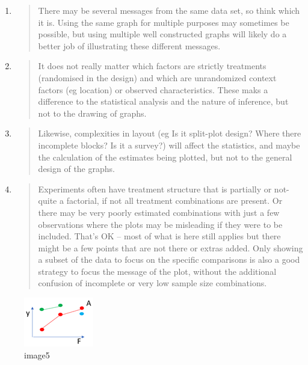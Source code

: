 \documentclass[
]{book}
\begin{document}
\begin{enumerate}
\def\labelenumi{\alph{enumi}.}
\item
  \begin{quote}
  There may be several messages from the same data set, so think which it is. Using the same graph for multiple purposes may sometimes be possible, but using multiple well constructed graphs will likely do a better job of illustrating these different messages.
  \end{quote}
\item
  \begin{quote}
  It does not really matter which factors are strictly treatments (randomised in the design) and which are unrandomized context factors (eg location) or observed characteristics. These maks a difference to the statistical analysis and the nature of inference, but not to the drawing of graphs.
  \end{quote}
\item
  \begin{quote}
  Likewise, complexities in layout (eg Is it split-plot design? Where there incomplete blocks? Is it a survey?) will affect the statistics, and maybe the calculation of the estimates being plotted, but not to the general design of the graphs.
  \end{quote}
\item
  \begin{quote}
  Experiments often have treatment structure that is partially or not-quite a factorial, if not all treatment combinations are present. Or there may be very poorly estimated combinations with just a few observations where the plots may be misleading if they were to be included. That's OK -- most of what is here still applies but there might be a few points that are not there or extras added. Only showing a subset of the data to focus on the specific comparisons is also a good strategy to focus the message of the plot, without the additional confusion of incomplete or very low sample size combinations.
  \end{quote}
\end{enumerate}

\begin{figure}
\centering
\includegraphics{img/Picture5.png}
\caption{image5}
\end{figure}
\end{document}
